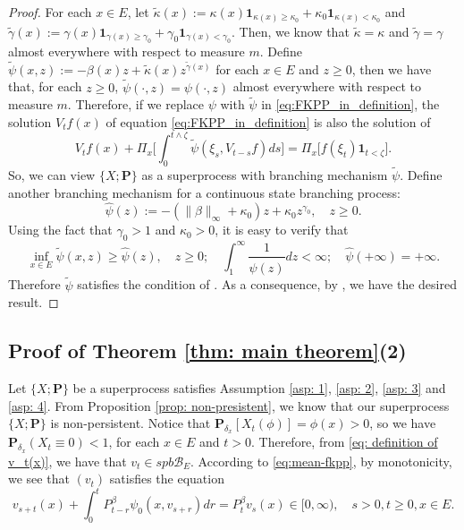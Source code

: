 \documentclass[12pt, a4paper]{amsart}
\theoremstyle{definition}
\numberwithin{equation}{section}
\begin{document}
\begin{proof}
	For each $x\in E$, let $\tilde \kappa(x) := \kappa(x) \mathbf 1_{\kappa(x)\geq \kappa_0} + \kappa_0 \mathbf 1_{\kappa(x) < \kappa_0}$ and $\tilde \gamma(x) := \gamma(x) \mathbf 1_{\gamma(x)\geq \gamma_0} + \gamma_0 \mathbf 1_{\gamma(x) < \gamma_0}$. 
	Then, we know that $\tilde \kappa = \kappa$ and $\tilde \gamma = \gamma$ almost everywhere with respect to measure $m$.
	Define $\tilde \psi(x,z) := - \beta(x)z+ \tilde \kappa(x)z^{\tilde \gamma(x)}$ for each $x\in E$ and $z\geq 0$, then we have that, for each $z\geq 0$, $\tilde \psi(\cdot, z) = \psi(\cdot , z) $ almost everywhere with respect to measure $m$.
	Therefore, if we replace $\psi$ with $\tilde\psi$ in \eqref{eq:FKPP_in_definition}, the solution $V_tf(x)$ of equation \eqref{eq:FKPP_in_definition} is also the solution of
\[
	V_t f(x) + \Pi_x \Big[  \int_0^{t\wedge \zeta} \tilde \psi (\xi_s,V_{t-s} f) ds \Big]
	=\Pi_x \big[ f(\xi_t)\mathbf 1_{t<\zeta} \big].
\] 
	So, we can view $\{X; \mathbf P\}$ as a superprocess with branching mechanism $\tilde \psi$.
	Define another branching mechanism for a continuous state branching process:
\[
	\hat\psi(z) 
	:= - (\|\beta\|_\infty +\kappa_0 )z + \kappa_0 z^{\gamma_0}, 
	\quad z\geq 0.
\]
	Using the fact that $\gamma_0 > 1$ and $\kappa_0 > 0$, it is easy to verify that 
\[
	\inf_{x\in E}\tilde \psi(x,z) 
	\geq \hat\psi(z),
	\quad z\geq 0; 
	\quad \int_1^\infty \frac{1}{\hat\psi(z)} dz 
	< \infty;
	\quad \hat \psi(+\infty) = +\infty.
\]
	Therefore $\tilde \psi$ satisfies the condition of \cite[Lemma 2.3]{RenSongZhang2015Limit}.
	As a consequence, by \cite[Lemma 2.3]{RenSongZhang2015Limit}, we have the desired result.
\end{proof}

\subsection{Proof of Theorem \ref{thm: main theorem}(2)}
\label{sec: proof of result 2}
	Let $\{X; \mathbf P\}$ be a superprocess satisfies Assumption \ref{asp: 1}, \ref{asp: 2}, \ref{asp: 3} and \ref{asp: 4}.
	From Proposition \ref{prop: non-presistent}, we know that our superprocess $\{X;\mathbf P\}$ is non-persistent.
	Notice that $\mathbf P_{\delta_x}[X_t(\phi)] = \phi(x)>0$, so we have $\mathbf P_{\delta_x}(X_t \equiv 0)<1$, for each $x\in E$ and $t>0$.
	Therefore, from \eqref{eq: definition of v_t(x)}, we have that $v_t \in spb\mathscr B_E$. 
	According to \eqref{eq:mean-fkpp}, by monotonicity, we see that $(v_t)$ satisfies the equation
\[
	v_{s+t}(x) + \int_0^t P^\beta_{t-r} \psi_0(x,v_{s+r}) dr
	= P^\beta_t v_s(x)
	\in [0,\infty),
	\quad s>0, t \geq 0,x \in E.
\]
\end{document}
